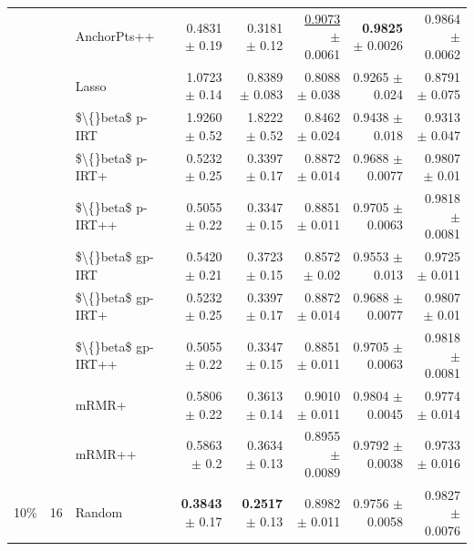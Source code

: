\begin{longtable}{llp{}rrrrr}
 &  & AnchorPts++ & 0.4831 {\scriptsize $\pm$ 0.19} & 0.3181 {\scriptsize $\pm$ 0.12} & \underline{0.9073} {\scriptsize $\pm$ 0.0061} & \textbf{0.9825} {\scriptsize $\pm$ 0.0026} & 0.9864 {\scriptsize $\pm$ 0.0062} \\
 &  & Lasso & 1.0723 {\scriptsize $\pm$ 0.14} & 0.8389 {\scriptsize $\pm$ 0.083} & 0.8088 {\scriptsize $\pm$ 0.038} & 0.9265 {\scriptsize $\pm$ 0.024} & 0.8791 {\scriptsize $\pm$ 0.075} \\
 &  & \$\textbackslash\{\}beta\$ p-IRT & 1.9260 {\scriptsize $\pm$ 0.52} & 1.8222 {\scriptsize $\pm$ 0.52} & 0.8462 {\scriptsize $\pm$ 0.024} & 0.9438 {\scriptsize $\pm$ 0.018} & 0.9313 {\scriptsize $\pm$ 0.047} \\
 &  & \$\textbackslash\{\}beta\$ p-IRT+ & 0.5232 {\scriptsize $\pm$ 0.25} & 0.3397 {\scriptsize $\pm$ 0.17} & 0.8872 {\scriptsize $\pm$ 0.014} & 0.9688 {\scriptsize $\pm$ 0.0077} & 0.9807 {\scriptsize $\pm$ 0.01} \\
 &  & \$\textbackslash\{\}beta\$ p-IRT++ & 0.5055 {\scriptsize $\pm$ 0.22} & 0.3347 {\scriptsize $\pm$ 0.15} & 0.8851 {\scriptsize $\pm$ 0.011} & 0.9705 {\scriptsize $\pm$ 0.0063} & 0.9818 {\scriptsize $\pm$ 0.0081} \\
 &  & \$\textbackslash\{\}beta\$ gp-IRT & 0.5420 {\scriptsize $\pm$ 0.21} & 0.3723 {\scriptsize $\pm$ 0.15} & 0.8572 {\scriptsize $\pm$ 0.02} & 0.9553 {\scriptsize $\pm$ 0.013} & 0.9725 {\scriptsize $\pm$ 0.011} \\
 &  & \$\textbackslash\{\}beta\$ gp-IRT+ & 0.5232 {\scriptsize $\pm$ 0.25} & 0.3397 {\scriptsize $\pm$ 0.17} & 0.8872 {\scriptsize $\pm$ 0.014} & 0.9688 {\scriptsize $\pm$ 0.0077} & 0.9807 {\scriptsize $\pm$ 0.01} \\
 &  & \$\textbackslash\{\}beta\$ gp-IRT++ & 0.5055 {\scriptsize $\pm$ 0.22} & 0.3347 {\scriptsize $\pm$ 0.15} & 0.8851 {\scriptsize $\pm$ 0.011} & 0.9705 {\scriptsize $\pm$ 0.0063} & 0.9818 {\scriptsize $\pm$ 0.0081} \\
 &  & mRMR+ & 0.5806 {\scriptsize $\pm$ 0.22} & 0.3613 {\scriptsize $\pm$ 0.14} & 0.9010 {\scriptsize $\pm$ 0.011} & 0.9804 {\scriptsize $\pm$ 0.0045} & 0.9774 {\scriptsize $\pm$ 0.014} \\
 &  & mRMR++ & 0.5863 {\scriptsize $\pm$ 0.2} & 0.3634 {\scriptsize $\pm$ 0.13} & 0.8955 {\scriptsize $\pm$ 0.0089} & 0.9792 {\scriptsize $\pm$ 0.0038} & 0.9733 {\scriptsize $\pm$ 0.016} \\
\midrule
10\% & 16 & Random & \textbf{0.3843} {\scriptsize $\pm$ 0.17} & \textbf{0.2517} {\scriptsize $\pm$ 0.13} & 0.8982 {\scriptsize $\pm$ 0.011} & 0.9756 {\scriptsize $\pm$ 0.0058} & 0.9827 {\scriptsize $\pm$ 0.0076} \\

\end{longtable}
